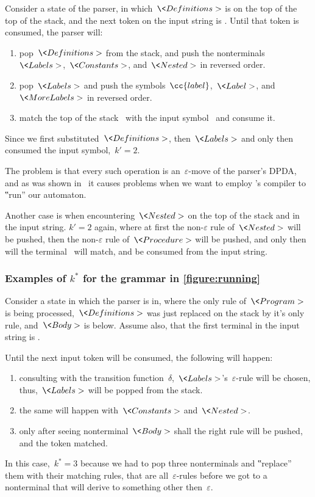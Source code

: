 Consider a state of the parser, in which~$\<Definitions>$ is on
  the top of the top of the stack, and the next token on the input string
  is .
Until that token is consumed, the parser will:
  \begin{enumerate}
    \item pop~$\<Definitions>$ from the stack, and push the
      nonterminals~$\<Labels>$,~$\<Constants>$, and~$\<Nested>$
      in reversed order.
    \item pop~$\<Labels>$ and push the symbols~$\cc{label}$,~$\<Label>$,
      and~$\<MoreLabels>$ in reversed order.
    \item match the top of the stack~ with the input
      symbol~ and consume it.
  \end{enumerate}
Since we first substituted~$\<Definitions>$, then~$\<Labels>$
  and only then consumed the input symbol,~$k'=2$.

The problem is that every such operation is an~$ε$-move of the
  parser's DPDA, and as was shown in~\cite{Gil:Levy:2016} it causes
  problems when we want to employ \Java's compiler to ‟run” our automaton.

Another case is when encountering~$\<Nested>$ on the top of the stack
  and  in the input string.
$k'=2$ again, where at first the non-$ε$ rule of~$\<Nested>$ will
  be pushed, then the non-$ε$ rule of~$\<Procedure>$ will be
  pushed, and only then will the terminal~ will match,
  and be consumed from the input string.

  \subsubsection{Examples of \texorpdfstring{$k^*$}{k*} for the grammar in \texorpdfstring{\cref{figure:running}}{}}
Consider a state in which the parser is in, where the
  only rule of~$\<Program>$ is being processed,~$\<Definitions>$
  was just replaced on the stack by it's only rule, and~$\<Body>$ is below.
Assume also, that the first terminal in the input string is .

Until the next input token will be consumed, the following will happen:
  \begin{enumerate}
    \item consulting with the transition
      function~$δ$,~$\<Labels>$'s~$ε$-rule will
      be chosen,
      thus,~$\<Labels>$ will be popped from the stack.
    \item the same will happen with~$\<Constants>$
      and~$\<Nested>$.
    \item only after seeing nonterminal~$\<Body>$ shall the right rule will be
      pushed, and the token matched.
  \end{enumerate}
In this case,~$k^*=3$ because we had to pop three nonterminals and
  ‟replace” them with their matching rules, that are all~$ε$-rules
  before we got to a nonterminal that will derive to something other
  then~$ε$.

